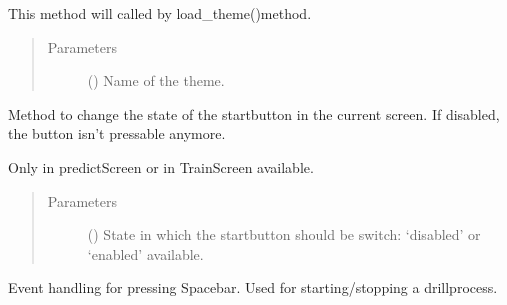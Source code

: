 \documentclass[letterpaper,10pt,english]{sphinxmanual}
\begin{document}
\begin{fulllineitems}
\begin{fulllineitems}
\sphinxAtStartPar
This method will called by load\_theme()\sphinxhyphen{}method.
\begin{quote}\begin{description}
\item[{Parameters}] \leavevmode
\sphinxAtStartPar
{} () \textendash{} Name of the theme.

\end{description}\end{quote}

\end{fulllineitems}


\begin{fulllineitems}
\label{\detokenize{anoog.automation:anoog.automation.graphical_user_interface.GUI_App.start_button}}
\sphinxAtStartPar
Method to change the state of the start\sphinxhyphen{}button in the current screen.
If disabled, the button isn’t pressable anymore.

\sphinxAtStartPar
Only in predict\sphinxhyphen{}Screen or in Train\sphinxhyphen{}Screen available.
\begin{quote}\begin{description}
\item[{Parameters}] \leavevmode
\sphinxAtStartPar
{} () \textendash{} State in which the start\sphinxhyphen{}button should be switch: ‘disabled’ or ‘enabled’ available.

\end{description}\end{quote}

\end{fulllineitems}


\begin{fulllineitems}
\label{\detokenize{anoog.automation:anoog.automation.graphical_user_interface.GUI_App.stop_time}}
\sphinxAtStartPar
Event handling for pressing Spacebar.
Used for starting/stopping a drill\sphinxhyphen{}process.

\end{fulllineitems}


\end{fulllineitems}
\end{document}

